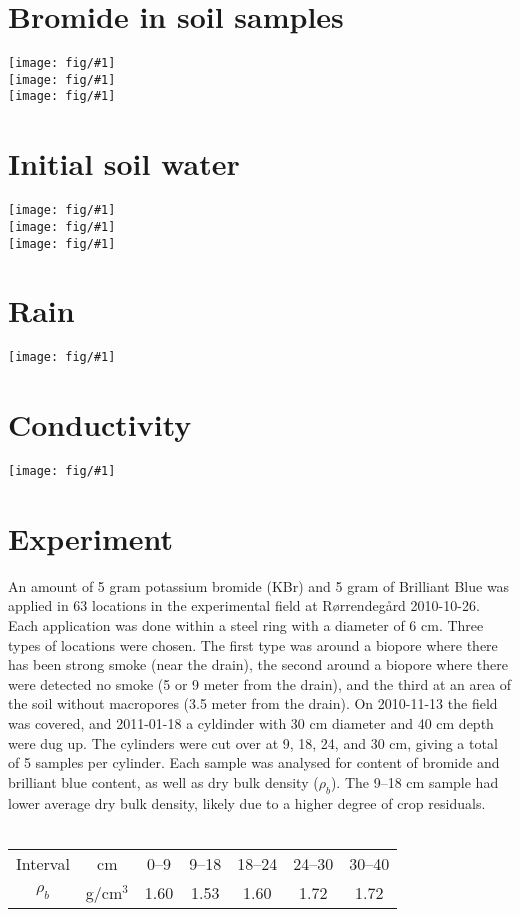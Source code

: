 \documentclass[a4paper]{article}
\newcommand{\fig}[1]{\texttt{[image: fig/\#1]}}
\begin{document}
\section*{Bromide in soil samples}

\noindent\fig{without-Br}\\
\fig{macro-Br}\\
\fig{drain-Br}

\section*{Initial soil water}

\noindent\fig{without-Pres}\\
\fig{macro-Pres}\\
\fig{drain-Pres}

\section*{Rain}

\noindent\fig{rain}

\section*{Conductivity}

\noindent\fig{conductivity}


\pagebreak{}
\section*{Experiment}

An amount of 5 gram potassium bromide (KBr) and 5 gram of Brilliant
Blue was applied in 63 locations in the experimental field at
Rørrendegård 2010-10-26.  Each application was done within a steel
ring with a diameter of 6 cm.  Three types of locations were chosen.
The first type was around a biopore where there has been strong smoke
(near the drain), the second around a biopore where there were
detected no smoke (5 or 9 meter from the drain), and the third at an
area of the soil without macropores (3.5 meter from the drain).  On
2010-11-13 the field was covered, and 2011-01-18 a cyldinder with 30
cm diameter and 40 cm depth were dug up. The cylinders were cut over
at 9, 18, 24, and 30 cm, giving a total of 5 samples per cylinder.
Each sample was analysed for content of bromide and brilliant blue
content, as well as dry bulk density ($\rho_b$).  The 9--18 cm sample
had lower average
dry bulk density, likely due to a higher degree of crop residuals.\\\\
\begin{tabular}{|c|c|ccccc|}\hline
  Interval & cm & 0--9 & 9--18 & 18--24 & 24--30 & 30--40\\
  $\rho_b$ & g/cm$^3$ & 1.60 & 1.53 & 1.60 & 1.72 & 1.72\\\hline
\end{tabular}\\
\end{document}
